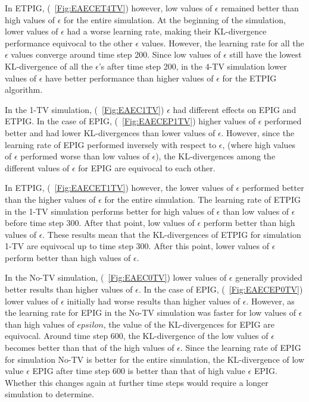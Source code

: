 \documentclass[12pt]{thesis}
\begin{document}

In ETPIG, (\figurename~\ref{Fig:EAECET4TV}) however, low values of $\epsilon$ remained better than high values of $\epsilon$ for the entire simulation. At the beginning of the simulation, lower values of $\epsilon$ had a worse learning rate, making their KL-divergence performance equivocal to the other $\epsilon$ values. However, the learning rate for all the $\epsilon$ values converge around time step 200. Since low values of $\epsilon$ still have the lowest KL-divergence of all the $\epsilon$'s after time step 200, in the 4-TV simulation lower values of $\epsilon$ have better performance than higher values of $\epsilon$ for the ETPIG algorithm.

In the 1-TV simulation, (\figurename~\ref{Fig:EAEC1TV}) $\epsilon$ had different effects on EPIG and ETPIG. In the case of EPIG, (\figurename~\ref{Fig:EAECEP1TV}) higher values of $\epsilon$ performed better and had lower KL-divergences than lower values of $\epsilon$. However, since the learning rate of EPIG performed inversely with respect to $\epsilon$, (where high values of $\epsilon$ performed worse than low values of $\epsilon$), the KL-divergences among the different values of $\epsilon$ for EPIG are equivocal to each other.

In ETPIG, (\figurename~\ref{Fig:EAECET1TV}) however, the lower values of $\epsilon$ performed better than the higher values of $\epsilon$ for the entire simulation. The learning rate of ETPIG in the 1-TV simulation performs better for high values of $\epsilon$ than low values of $\epsilon$ before time step 300. After that point, low values of $\epsilon$ perform better than high values of $\epsilon$. These results mean that the KL-divergences of ETPIG for simulation 1-TV are equivocal up to time step 300. After this point, lower values of $\epsilon$ perform better than high values of $\epsilon$.


In the No-TV simulation, (\figurename~\ref{Fig:EAEC0TV}) lower values of $\epsilon$ generally provided better results than higher values of $\epsilon$. In the case of EPIG, (\figurename~\ref{Fig:EAECEP0TV}) lower values of $\epsilon$ initially had worse results than higher values of $\epsilon$. However, as the learning rate for EPIG in the No-TV simulation was faster for low values of $\epsilon$ than high values of $epsilon$, the value of the KL-divergences for EPIG are equivocal. Around time step 600, the KL-divergence of the low values of $\epsilon$ becomes better than that of the high values of $\epsilon$. Since the learning rate of EPIG for simulation No-TV is better for the entire simulation, the KL-divergence of low value $\epsilon$ EPIG after time step 600 is better than that of high value $\epsilon$ EPIG. Whether this changes again at further time steps would require a longer simulation to determine.
\end{document}
